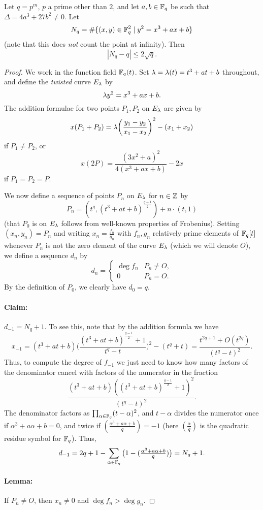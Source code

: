\documentclass[letterpaper,11pt]{article}
\begin{document}
\begin{thm} Let $q = p^m$, $p$ a prime other than $2$, and let $a,b \in \mathbb{F}_q$ be such that $\Delta = 4a^3+27b^2 \ne 0$. Let
\[
N_q = \#\{(x,y)\in\mathbb{F}_q^2 \mid y^2 = x^3 + ax + b\}
\]
(note that this does \emph{not} count the point at infinity). Then
\[
|N_q - q| \le 2\sqrt{q}.
\]
\end{thm}
\begin{proof} We work in the function field $\mathbb{F}_q(t)$. Set $\lambda = \lambda(t) = t^3+at+b$ throughout, and define the \emph{twisted} curve $E_{\lambda}$ by
\[
\lambda y^2 = x^3 + ax + b.
\]
The addition formulae for two points $P_1, P_2$ on $E_{\lambda}$ are given by
\[
x(P_1 + P_2) = \lambda\bigg(\frac{y_1-y_2}{x_1-x_2}\bigg)^2 - (x_1 + x_2)
\]
if $P_1 \ne P_2$, or
\[
x(2P) = \frac{(3x^2 + a)^2}{4(x^3+ax+b)}-2x
\]
if $P_1 = P_2 = P$.

We now define a sequence of points $P_n$ on $E_{\lambda}$ for $n \in \mathbb{Z}$ by
\[
P_n = (t^q, (t^3 + at + b)^{\frac{q-1}{2}}) + n\cdot(t,1)
\]
(that $P_0$ is on $E_{\lambda}$ follows from well-known properties of Frobenius). Setting $(x_n,y_n) = P_n$ and writing $x_n = \frac{f_n}{g_n}$ with $f_n,g_n$ relatively prime elements of $\mathbb{F}_q[t]$ whenever $P_n$ is not the zero element of the curve $E_{\lambda}$ (which we will denote $O$), we define a sequence $d_n$ by
\[
d_n = \begin{cases}\deg f_n & P_n \ne O,\\ 0 & P_n = O. \end{cases}
\]
By the definition of $P_0$, we clearly have $d_0 = q$.
\paragraph{Claim:} $d_{-1} = N_q + 1$. To see this, note that by the addition formula we have
\[
x_{-1} = (t^3+at+b)\bigg(\frac{(t^3+at+b)^{\frac{q-1}{2}}+1}{t^q-t}\bigg)^2 - (t^q + t) = \frac{t^{2q+1}+O(t^{2q})}{(t^q-t)^2}.
\]
Thus, to compute the degree of $f_{-1}$ we just need to know how many factors of the denominator cancel with factors of the numerator in the fraction
\[
\frac{(t^3+at+b)((t^3+at+b)^{\frac{q-1}{2}}+1)^2}{(t^q-t)^2}.
\]
The denominator factors as $\prod_{\alpha\in\mathbb{F}_q} (t-\alpha)^2$, and $t-\alpha$ divides the numerator once if $\alpha^3 + a\alpha + b = 0$, and twice if $(\frac{\alpha^3+a\alpha+b}{q}) = -1$ (here $(\frac{\alpha}{q})$ is the quadratic residue symbol for $\mathbb{F}_q$). Thus,
\[
d_{-1} = 2q+1 - \sum_{\alpha\in\mathbb{F}_q}\big(1-(\tfrac{\alpha^3+a\alpha+b}{q})\big) = N_q + 1.
\]
\paragraph{Lemma:} If $P_n \ne O$, then $x_n \ne 0$ and $\deg f_n > \deg g_n$.

\end{proof}
\end{document}
